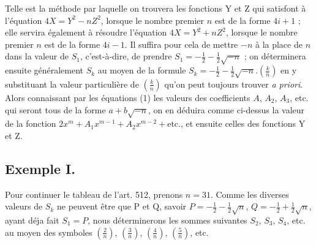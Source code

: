 \documentclass[11pt,a4paper]{article}
\begin{document}
Telle est la méthode par laquelle on trouvera les fonctions Y et Z qui
satisfont à l'équation $4X = Y^2 - nZ^2$, lorsque le nombre premier $n$ est
de la forme $4i + 1$ ; elle servira également à résoudre l'équation
$4X = Y^2 + nZ^2$, lorsque le nombre premier $n$ est de la forme $4i - 1$.
Il suffira pour cela de mettre $-n$ à la place de $n$ dans la valeur de
$S_1$, c'est-à-dire, de prendre
$S_1 = -\frac{1}{2} - \frac{1}{2}\sqrt{-n}$ ; on déterminera ensuite
généralement $S_k$ au moyen de la formule
$S_k = -\frac{1}{2} - \frac{1}{2}\sqrt{-n}.\left(\frac{k}{n}\right)$ en y
substituant la valeur particulière de $\left(\frac{k}{n}\right)$ qu'on peut
toujours trouver \emph{a priori}. Alors connaissant par les équations (1)
les valeurs des coefficients $A$, $A_2$, $A_3$, etc. qui seront tous de la
forme $a + b\sqrt{-n}$, on en déduira comme ci-dessus la valeur de la
fonction $2x^m + A_1 x^{m-1} + A_2 x^{m-2} + \text{etc.}$, et ensuite celles
des fonctions Y et Z.

\subsection{Exemple I.}

Pour continuer le tableau de l'art. 512, prenons $n = 31$. Comme les
diverses valeurs de $S_k$ ne peuvent être que P et Q, savoir
$P = -\frac{1}{2} - \frac{1}{2}\sqrt{n}$,
$Q = -\frac{1}{2} + \frac{1}{2}\sqrt{n}$, ayant déja fait $S_1 = P$, nous
déterminerons les sommes suivantes $S_2$, $S_3$, $S_4$, etc. au moyen des
symboles $\left(\frac{2}{n}\right)$, $\left(\frac{3}{n}\right)$,
$\left(\frac{4}{n}\right)$, $\left(\frac{5}{n}\right)$, etc.

\end{document}
